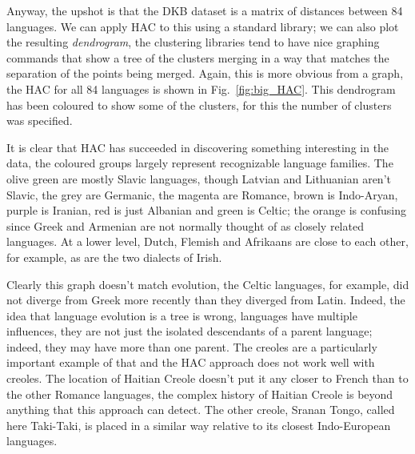 \documentclass[12pt]{article}
\begin{document}
Anyway, the upshot is that the DKB dataset is a matrix of distances
between 84 languages. We can apply HAC to this using a standard
library; we can also plot the resulting \textsl{dendrogram}, the
clustering libraries tend to have nice graphing commands that show a
tree of the clusters merging in a way that matches the separation of
the points being merged. Again, this is more obvious from a graph, the
HAC for all 84 languages is shown in Fig.~\ref{fig:big_HAC}. This
dendrogram has been coloured to show some of the clusters, for this the
number of clusters was specified.

It is clear that HAC has succeeded in discovering something
interesting in the data, the coloured groups largely represent
recognizable language families. The olive green are mostly Slavic
languages, though Latvian and Lithuanian aren't Slavic, the grey are
Germanic, the magenta are Romance, brown is Indo-Aryan, purple is
Iranian, red is just Albanian and green is Celtic; the orange is
confusing since Greek and Armenian are not normally thought of as
closely related languages. At a lower level, Dutch, Flemish and
Afrikaans are close to each other, for example, as are the two
dialects of Irish.

Clearly this graph doesn't match evolution, the Celtic languages, for
example, did not diverge from Greek more recently than they diverged
from Latin. Indeed, the idea that language evolution is a tree is
wrong, languages have multiple influences, they are not just the
isolated descendants of a parent language; indeed, they may have more
than one parent. The creoles are a particularly important example of
that and the HAC approach does not work well with creoles. The
location of Haitian Creole doesn't put it any closer to French than to
the other Romance languages, the complex history of Haitian Creole is
beyond anything that this approach can detect. The other creole,
Sranan Tongo, called here Taki-Taki, is placed in a similar way
relative to its closest Indo-European languages.
\end{document}
